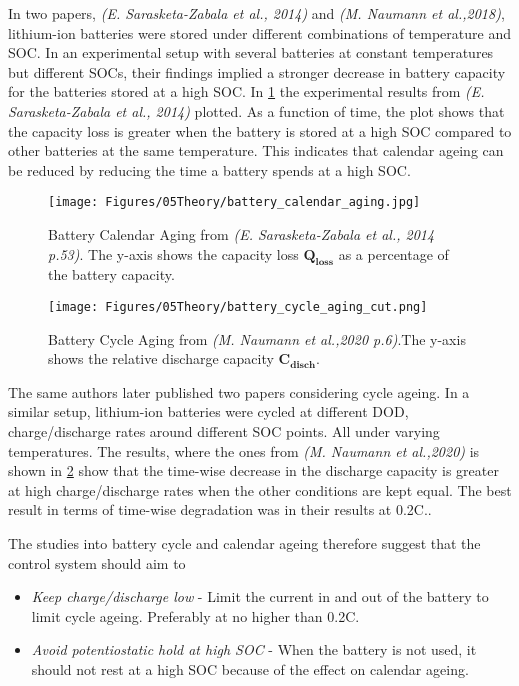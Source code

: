 In two papers, \textit{(E. Sarasketa-Zabala et al., 2014)} and \textit{(M. Naumann et al.,2018)}, lithium-ion batteries were stored under different combinations of temperature and SOC. In an experimental setup with several batteries at constant temperatures but different SOCs, their findings implied a stronger decrease in battery capacity for the  batteries stored at a high SOC. \cite{NAUMANN2018153} In \ref{fig:battery_calendar_aging} the experimental results from \textit{(E. Sarasketa-Zabala et al., 2014)} plotted. As a function of time, the plot shows that the capacity loss is greater when the battery is stored at a high SOC compared to other batteries at the same temperature.\cite{SARASKETAZABALA201445}  This indicates that calendar ageing can be reduced by reducing the time a battery spends at a high SOC.\\

\begin{figure}
    \centering
    \texttt{[image: Figures/05Theory/battery\_calendar\_aging.jpg]}
    \caption[Battery Calendar Aging]{Battery Calendar Aging from \textit{(E. Sarasketa-Zabala et al., 2014 p.53)}\cite{SARASKETAZABALA201445}. The y-axis shows the capacity loss $\mathbf{Q_{loss}}$ as a percentage of the battery capacity.}
    \label{fig:battery_calendar_aging}
\end{figure}

\begin{figure}
    \centering
    \texttt{[image: Figures/05Theory/battery\_cycle\_aging\_cut.png]}
    \caption[Battery Cycle Aging]{Battery Cycle Aging from \textit{(M. Naumann et al.,2020 p.6)}\cite{NAUMANN2020227666}.The y-axis shows the relative discharge capacity $\mathbf{C_{disch}}$.}
    \label{fig:battery_cycle_aging_cut}
\end{figure}

The same authors later published two papers considering cycle ageing. In a similar setup, lithium-ion batteries were cycled at different DOD, charge/discharge rates around different SOC points. All under varying temperatures. The results, where the ones from \textit{(M. Naumann et al.,2020)} is shown in \ref{fig:battery_cycle_aging_cut} show that the time-wise decrease in the discharge capacity is greater at high charge/discharge rates when the other conditions are kept equal. The best result in terms of time-wise degradation was in their results at 0.2C.\cite{SARASKETAZABALA2015573}\cite{NAUMANN2020227666}. 

The studies into battery cycle and calendar ageing therefore suggest that the control system should aim to 
\begin{itemize}
    \item \textit{Keep charge/discharge low}    -   Limit the current in and out of the battery to limit cycle ageing. Preferably at no higher than 0.2C.
    \item \textit{Avoid potentiostatic hold at high SOC}    -   When the battery is not used, it should not rest at a high SOC because of the effect on calendar ageing. 
\end{itemize}